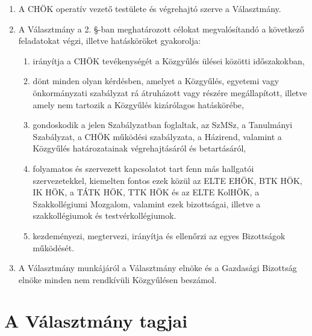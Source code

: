 \documentclass{../styles/rulebook}
\begin{document}
\begin{enumerate}
	\item A CHÖK operatív vezető testülete és végrehajtó szerve a Választmány.
	\item A Választmány a 2. §-ban meghatározott célokat megvalósítandó a következő feladatokat végzi, illetve hatásköröket gyakorolja:
	\begin{enumerate}
		\item irányítja a CHÖK tevékenységét a Közgyűlés ülései közötti időszakokban,
		\item dönt minden olyan kérdésben, amelyet a Közgyűlés, egyetemi vagy önkormányzati szabályzat rá átruházott vagy részére megállapított, illetve amely nem tartozik a Közgyűlés kizárólagos hatáskörébe,
		\item gondoskodik a jelen Szabályzatban foglaltak, az SzMSz, a Tanulmányi Szabályzat, a CHÖK működési szabályzata, a Házirend, valamint a Közgyűlés határozatainak végrehajtásáról és betartásáról,
		\item folyamatos és szervezett kapcsolatot tart fenn más hallgatói szervezetekkel, kiemelten fontos ezek közül az ELTE EHÖK, BTK HÖK, IK HÖK, a TÁTK HÖK, TTK HÖK és az ELTE KolHÖK, a Szakkollégiumi Mozgalom, valamint ezek bizottságai, illetve a szakkollégiumok és testvérkollégiumok.
		\item kezdeményezi, megtervezi, irányítja és ellenőrzi az egyes Bizottságok működését.
	\end{enumerate}
	\item A Választmány munkájáról a Választmány elnöke és a Gazdasági Bizottság elnöke minden nem rendkívüli Közgyűlésen beszámol.
\end{enumerate}


\section{A Választmány tagjai}
\end{document}
